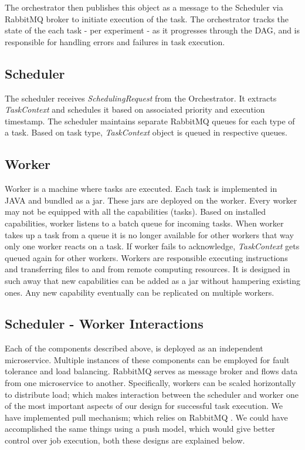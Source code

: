 \documentclass[sigconf]{acmart}
\begin{document}
The orchestrator then publishes this object as a message to the Scheduler via RabbitMQ broker to initiate execution of the task. The orchestrator tracks the state of the each task - per experiment - as it progresses through the DAG, and is responsible for handling errors and failures in task execution.

\subsection{Scheduler}
The scheduler receives \textit{SchedulingRequest} from the Orchestrator. It extracts \textit{TaskContext} and schedules it based on associated priority and execution timestamp. The scheduler maintains separate RabbitMQ queues for each type of a task. Based on task type, \textit{TaskContext} object is queued in respective queues.

\subsection{Worker}
Worker is a  machine where tasks are executed. Each task is implemented in JAVA and bundled as a jar. These jars are deployed on the worker. Every worker may not be equipped with all the capabilities (tasks). Based on installed capabilities, worker listens to a batch queue for incoming tasks. When worker takes up a task from a queue it is no longer available for other workers that way only one worker reacts on a task. If worker fails to acknowledge, \textit{TaskContext} gets queued again for other workers. Workers are responsible executing instructions and transferring files to and from remote computing resources. It is designed in such  away that new capabilities can be added as a jar without hampering existing ones. Any new capability eventually can be replicated on multiple workers. 

\subsection {Scheduler - Worker Interactions}
Each of the components described above, is deployed as an independent microservice. Multiple instances of these components can be employed for fault tolerance and load balancing. RabbitMQ serves as message broker and flows data from one microservice to another. Specifically, workers can be scaled horizontally to distribute load; which makes interaction between the scheduler and worker one of the most important aspects of our design for successful task execution. We have implemented pull mechanism; which relies on RabbitMQ \cite{sadooghi2014achieving}. We could have accomplished the same things using a push model, which would give better control over job execution, both these designs are explained below.
\end{document}
